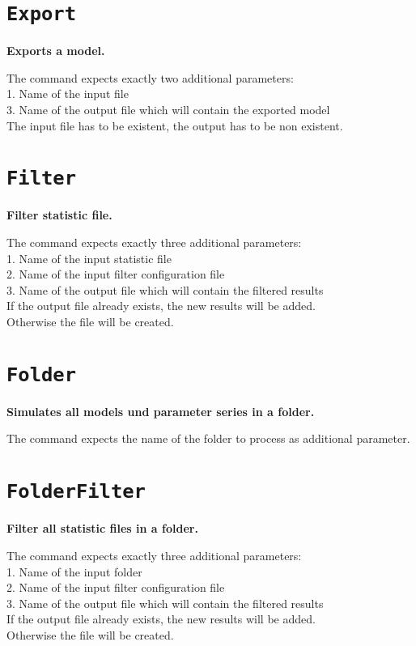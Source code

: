 \section{\texttt{Export}}

\textbf{Exports a model.}

The command expects exactly two additional parameters:\\
1. Name of the input file\\
3. Name of the output file which will contain the exported model\\
The input file has to be existent, the output has to be non existent.

\section{\texttt{Filter}}

\textbf{Filter statistic file.}

The command expects exactly three additional parameters:\\
1. Name of the input statistic file\\
2. Name of the input filter configuration file\\
3. Name of the output file which will contain the filtered results\\
If the output file already exists, the new results will be added.\\
Otherwise the file will be created.

\section{\texttt{Folder}}

\textbf{Simulates all models und parameter series in a folder.}

The command expects the name of the folder to process as additional parameter.

\section{\texttt{FolderFilter}}

\textbf{Filter all statistic files in a folder.}

The command expects exactly three additional parameters:\\
1. Name of the input folder\\
2. Name of the input filter configuration file\\
3. Name of the output file which will contain the filtered results\\
If the output file already exists, the new results will be added.\\
Otherwise the file will be created.

